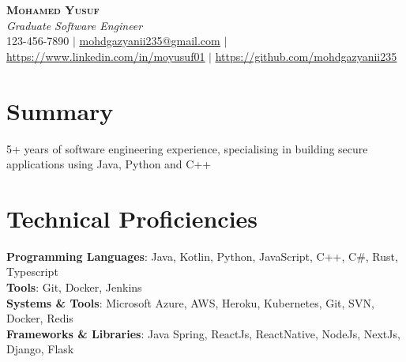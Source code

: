 \documentclass[letterpaper,11pt]{article}
\begin{document}

\begin{center}
    \textbf{\Huge \scshape Mohamed Yusuf} \\ \vspace{1pt}
    \small \textit{Graduate Software Engineer} \\
    123-456-7890 $|$ \href{mailto:mohdgazyanii235@gmail.com}{\underline{mohdgazyanii235@gmail.com}} $|$
    \href{https://www.linkedin.com/in/moyusuf01}{\underline{https://www.linkedin.com/in/moyusuf01}} $|$
    \href{https://github.com/mohdgazyanii235}{\underline{https://github.com/mohdgazyanii235}}
\end{center}

    \section*{Summary}
    5+ years of software engineering experience, specialising in building secure applications using Java, Python and C++


    \section{Technical Proficiencies}
        \begin{itemize}[leftmargin=0.15in, label={}]
            \small{\item{
                    \textbf{Programming Languages}{: Java, Kotlin, Python, JavaScript, C++, C#, Rust, Typescript} \\
                    \textbf{Tools}{: Git, Docker, Jenkins} \\
                    \textbf{Systems \& Tools}{: Microsoft Azure, AWS, Heroku, Kubernetes, Git, SVN, Docker, Redis} \\
                    \textbf{Frameworks \& Libraries}{: Java Spring, ReactJs, ReactNative, NodeJs, NextJs, Django, Flask} 
            }}
        \end{itemize}
\end{document}
